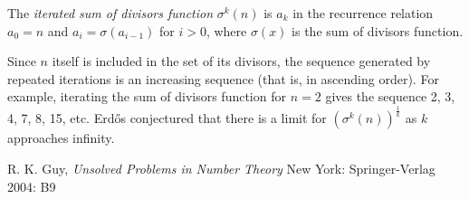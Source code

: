 \documentclass[12pt]{article}
\begin{document}
The {\em iterated sum of divisors function} $\sigma^k(n)$ is $a_k$ in the recurrence relation $a_0 = n$ and $a_i = \sigma(a_{i - 1})$ for $i > 0$, where $\sigma(x)$ is the sum of divisors function.

Since $n$ itself is included in the set of its divisors, the sequence generated by repeated iterations is an increasing sequence (that is, in ascending order). For example, iterating the sum of divisors function for $n = 2$ gives the sequence 2, 3, 4, 7, 8, 15, etc. Erd\H{o}s conjectured that there is a limit for $(\sigma^k(n))^{\frac{1}{k}}$ as $k$ approaches infinity.

\begin{thebibliography}{1}
 R. K. Guy, {\it Unsolved Problems in Number Theory} New York: Springer-Verlag 2004: B9
\end{thebibliography}

\end{document}
